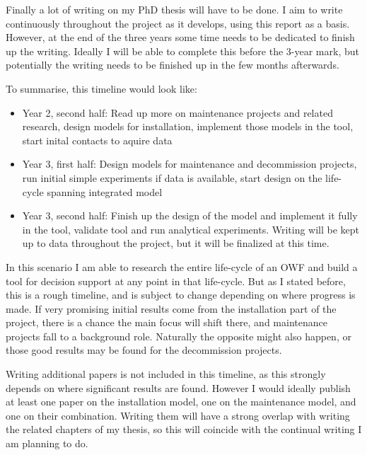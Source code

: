 \documentclass[a4paper,12pt]{article}
\begin{document}
Finally a lot of writing on my PhD thesis will have to be done. I aim to write continuously throughout the project as it develops, using this report as a basis. However, at the end of the three years some time needs to be dedicated to finish up the writing. Ideally I will be able to complete this before the 3-year mark, but potentially the writing needs to be finished up in the few months afterwards. 

\bigskip

To summarise, this timeline would look like:

\begin{itemize}
	\item Year 2, second half: Read up more on maintenance projects and related research, design models for installation, implement those models in the tool, start inital contacts to aquire data
	\item Year 3, first half: Design models for maintenance and decommission projects, run initial simple experiments if data is available, start design on the life-cycle spanning integrated model
	\item Year 3, second half: Finish up the design of the model and implement it fully in the tool, validate tool and run analytical experiments. Writing will be kept up to data throughout the project, but it will be finalized at this time. 
\end{itemize}

In this scenario I am able to research the entire life-cycle of an OWF and build a tool for decision support at any point in that life-cycle. But as I stated before, this is a rough timeline, and is subject to change depending on where progress is made. If very promising initial results come from the installation part of the project, there is a chance the main focus will shift there, and maintenance projects fall to a background role. Naturally the opposite might also happen, or those good results may be found for the decommission projects. 

Writing additional papers is not included in this timeline, as this strongly depends on where significant results are found. However I would ideally publish at least one paper on the installation model, one on the maintenance model, and one on their combination. Writing them will have a strong overlap with writing the related chapters of my thesis, so this will coincide with the continual writing I am planning to do. 

\pagebreak




\end{document}
